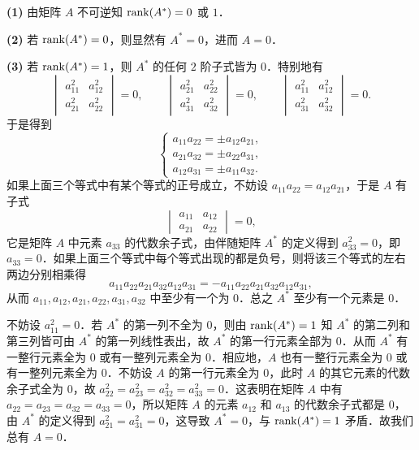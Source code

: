 \begin{solution}
\textbf{(1)} 由矩阵 $A$ 不可逆知 $\operatorname{rank}(A^*)=0$ 或 $1$．

\textbf{(2)} 若 $\operatorname{rank}(A^*)=0$，则显然有 $A^*=0$，进而 $A=0$．

\textbf{(3)} 若 $\operatorname{rank}(A^*)=1$，则 $A^*$ 的任何 $2$ 阶子式皆为 $0$．特别地有
\[
  \begin{vmatrix}
    a_{11}^2 & a_{12}^2\\
    a_{21}^2 & a_{22}^2
  \end{vmatrix}=0,\qquad
  \begin{vmatrix}
    a_{21}^2 & a_{22}^2\\
    a_{31}^2 & a_{32}^2
  \end{vmatrix}=0,\qquad
  \begin{vmatrix}
    a_{11}^2 & a_{12}^2\\
    a_{31}^2 & a_{32}^2
  \end{vmatrix}=0.
\]
于是得到
\[
  \begin{cases}
    a_{11}a_{22}=\pm a_{12}a_{21},\\
    a_{21}a_{32}=\pm a_{22}a_{31},\\
    a_{12}a_{31}=\pm a_{11}a_{32}.
  \end{cases}
\]
如果上面三个等式中有某个等式的正号成立，不妨设 $a_{11}a_{22}=a_{12}a_{21}$，于是 $A$ 有子式
\[
  \begin{vmatrix}
    a_{11} & a_{12}\\
    a_{21} & a_{22}
  \end{vmatrix}=0,
\]
它是矩阵 $A$ 中元素 $a_{33}$ 的代数余子式，由伴随矩阵 $A^*$ 的定义得到 $a_{33}^2=0$，即 $a_{33}=0$．如果上面三个等式中每个等式出现的都是负号，则将该三个等式的左右两边分别相乘得
\[
  a_{11}a_{22}a_{21}a_{32}a_{12}a_{31}=-a_{11}a_{22}a_{21}a_{32}a_{12}a_{31},
\]
从而 $a_{11},a_{12},a_{21},a_{22},a_{31},a_{32}$ 中至少有一个为 $0$．总之 $A^*$ 至少有一个元素是 $0$．

不妨设 $a_{11}^2=0$．若 $A^*$ 的第一列不全为 $0$，则由 $\operatorname{rank}(A^*)=1$ 知 $A^*$ 的第二列和第三列皆可由 $A^*$ 的第一列线性表出，故 $A^*$ 的第一行元素全部为 $0$．从而 $A^*$ 有一整行元素全为 $0$ 或有一整列元素全为 $0$．相应地，$A$ 也有一整行元素全为 $0$ 或有一整列元素全为 $0$．不妨设 $A$ 的第一行元素全为 $0$，此时 $A$ 的其它元素的代数余子式全为 $0$，故 $a_{22}^2=a_{23}^2=a_{32}^2=a_{33}^2=0$．这表明在矩阵 $A$ 中有 $a_{22}=a_{23}=a_{32}=a_{33}=0$，所以矩阵 $A$ 的元素 $a_{12}$ 和 $a_{13}$ 的代数余子式都是 $0$，由 $A^*$ 的定义得到 $a_{21}^2=a_{31}^2=0$，这导致 $A^*=0$，与 $\operatorname{rank}(A^*)=1$ 矛盾．故我们总有 $A=0$．
\end{solution}

